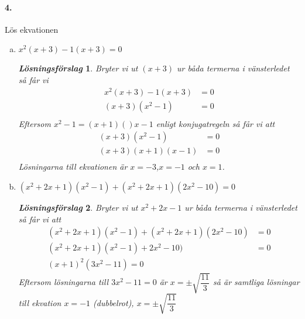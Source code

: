 \documentclass[a4paper]{article}
\newtheorem*{sol}{\normalfont\textit{Lösningsförslag}}
\begin{document}
\paragraph{4.} Lös ekvationen
\begin{enumerate}[(a)]
\item $x^2(x+3) - 1(x+3) = 0$
  \begin{sol}
    Bryter vi ut $(x+3)$ ur båda termerna i vänsterledet så får vi
    \begin{align*}
      x^2(x+3) - 1(x+3) &= 0\\[1em]
      (x+3)(x^2 -1) &= 0\\[1em]
    \end{align*}
    Eftersom $x^2-1 = (x+1)()x-1$ enligt konjugatregeln så får vi att
    \begin{align*}
      (x+3)(x^2 -1) &= 0\\[1em]
      (x+3)(x+1)(x-1) &= 0\\[1em]
    \end{align*}    
    Lösningarna till ekvationen är $x = -3$,$x = -1$ och $x = 1$.
  \end{sol}
\item $(x^2+2x+1)(x^2-1) + (x^2+2x +1)(2x^2 -10) = 0$
  \begin{sol}
    Bryter vi ut $x^2+2x-1$ ur båda termerna i vänsterledet så får vi
    att
    \begin{align*}
      (x^2+2x+1)(x^2-1) + (x^2+2x +1)(2x^2 -10) &= 0 \\[1em]
      (x^2+2x+1)(x^2-1) + 2x^2 -10) &= 0 \\[1em]
      (x+1)^2(3x^2 -11) = 0
    \end{align*}
    Eftersom lösningarna till $3x^2 -11 = 0$ är $x = \pm
    \sqrt{\dfrac{11}{3}}$ så är samtliga lösningar till ekvation
    $x = -1$ (dubbelrot), $x = \pm
    \sqrt{\dfrac{11}{3}}$
  \end{sol}
\end{enumerate}
\end{document}
